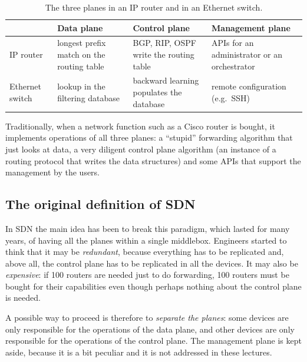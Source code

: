 \begin{table}[h]
\centering
\renewcommand{\arraystretch}{1.25}
\begin{tabular}{@{}>{\raggedright\arraybackslash}p{2.4cm}>{\raggedright\arraybackslash}p{3.9cm}>{\raggedright\arraybackslash}p{3.7cm}>{\raggedright\arraybackslash}p{3.4cm}@{}}
\toprule
 & \textbf{Data plane} & \textbf{Control plane} & \textbf{Management plane} \\
\midrule
IP router & longest prefix match on the routing table & BGP, RIP, OSPF write the routing table & APIs for an administrator or an orchestrator \\
Ethernet switch & lookup in the filtering database & backward learning populates the database & remote configuration (e.g.\ SSH) \\
\bottomrule
\end{tabular}
\caption{The three planes in an IP router and in an Ethernet switch.}
\end{table}

Traditionally, when a network function such as a Cisco router is bought, it implements operations of all three planes: a ``stupid'' forwarding algorithm that just looks at data, a very diligent control plane algorithm (an instance of a routing protocol that writes the data structures) and some APIs that support the management by the users.

\subsection{The original definition of SDN}

In SDN the main idea has been to break this paradigm, which lasted for many years, of having all the planes within a single middlebox. Engineers started to think that it may be \emph{redundant}, because everything has to be replicated and, above all, the control plane has to be replicated in all the devices. It may also be \emph{expensive}: if 100 routers are needed just to do forwarding, 100 routers must be bought for their capabilities even though perhaps nothing about the control plane is needed.

A possible way to proceed is therefore to \emph{separate the planes}: some devices are only responsible for the operations of the data plane, and other devices are only responsible for the operations of the control plane. The management plane is kept aside, because it is a bit peculiar and it is not addressed in these lectures.

\begin{center}
\end{center}

